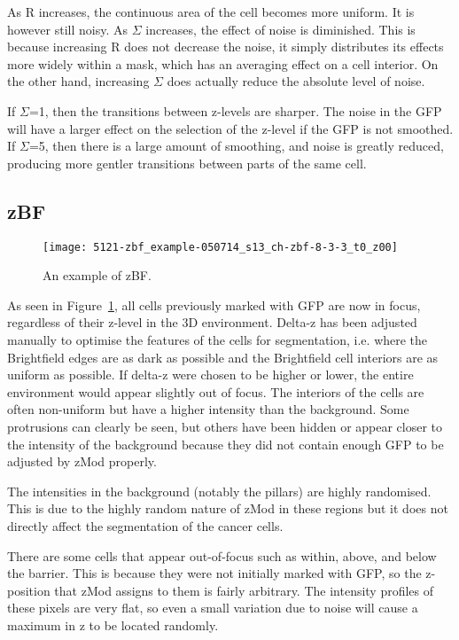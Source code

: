 As R increases, the continuous area of the cell becomes more uniform. It is however still noisy. As $\Sigma$ increases, the effect of noise is diminished. This is because increasing R does not decrease the noise, it simply distributes its effects more widely within a mask, which has an averaging effect on a cell interior. On the other hand, increasing $\Sigma$ does actually reduce the absolute level of noise.

If $\Sigma$=1, then the transitions between z-levels are sharper. The noise in the GFP will have a larger effect on the selection of the z-level if the GFP is not smoothed. If $\Sigma$=5, then there is a large amount of smoothing, and noise is greatly reduced, producing more gentler transitions between parts of the same cell.

\subsection{zBF}

\begin{figure}[htbp!]
\centering
\texttt{[image: 5121-zbf\_example-050714\_s13\_ch-zbf-8-3-3\_t0\_z00]}
\caption{An example of zBF.}
\label{fig:zbf_example}
\end{figure}

As seen in Figure~\ref{fig:zbf_example}, all cells previously marked with GFP are now in focus, regardless of their z-level in the 3D environment. Delta-z has been adjusted manually to optimise the features of the cells for segmentation, i.e. where the Brightfield edges are as dark as possible and the Brightfield cell interiors are as uniform as possible. If delta-z were chosen to be higher or lower, the entire environment would appear slightly out of focus. The interiors of the cells are often non-uniform but have a higher intensity than the background. Some protrusions can clearly be seen, but others have been hidden or appear closer to the intensity of the background because they did not contain enough GFP to be adjusted by zMod properly.

The intensities in the background (notably the pillars) are highly randomised. This is due to the highly random nature of zMod in these regions but it does not directly affect the segmentation of the cancer cells.

There are some cells that appear out-of-focus such as within, above, and below the barrier. This is because they were not initially marked with GFP, so the z-position that zMod assigns to them is fairly arbitrary. The intensity profiles of these pixels are very flat, so even a small variation due to noise will cause a maximum in z to be located randomly.

